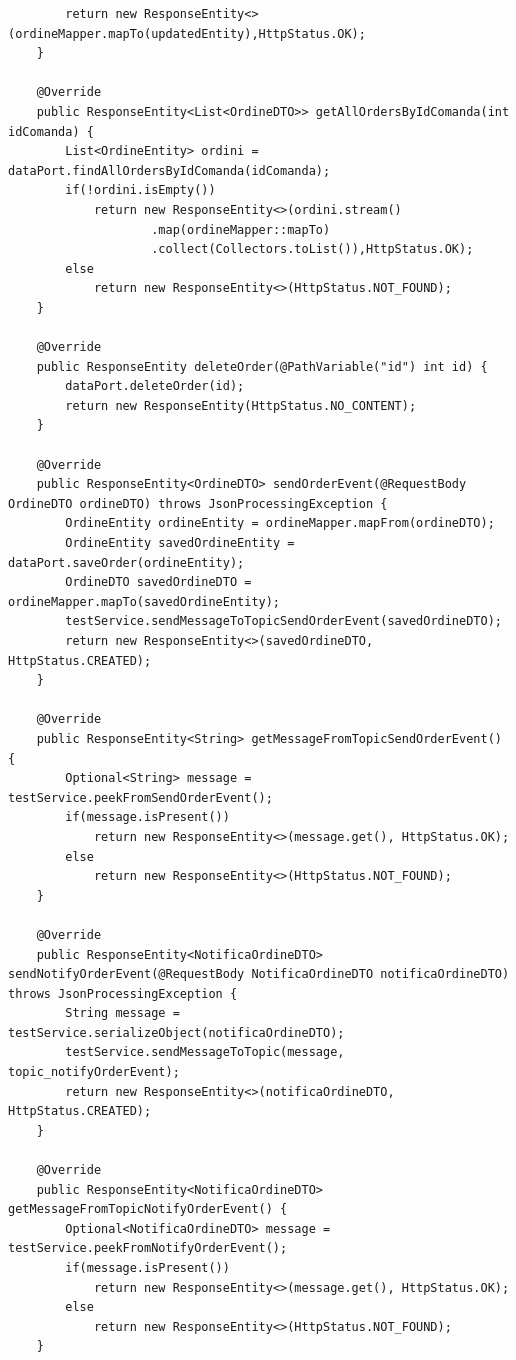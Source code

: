 \begin{lstlisting}
        return new ResponseEntity<>(ordineMapper.mapTo(updatedEntity),HttpStatus.OK);
    }

    @Override
    public ResponseEntity<List<OrdineDTO>> getAllOrdersByIdComanda(int idComanda) {
        List<OrdineEntity> ordini = dataPort.findAllOrdersByIdComanda(idComanda);
        if(!ordini.isEmpty())
            return new ResponseEntity<>(ordini.stream()
                    .map(ordineMapper::mapTo)
                    .collect(Collectors.toList()),HttpStatus.OK);
        else
            return new ResponseEntity<>(HttpStatus.NOT_FOUND);
    }

    @Override
    public ResponseEntity deleteOrder(@PathVariable("id") int id) {
        dataPort.deleteOrder(id);
        return new ResponseEntity(HttpStatus.NO_CONTENT);
    }

    @Override
    public ResponseEntity<OrdineDTO> sendOrderEvent(@RequestBody OrdineDTO ordineDTO) throws JsonProcessingException {
        OrdineEntity ordineEntity = ordineMapper.mapFrom(ordineDTO);
        OrdineEntity savedOrdineEntity = dataPort.saveOrder(ordineEntity);
        OrdineDTO savedOrdineDTO = ordineMapper.mapTo(savedOrdineEntity);
        testService.sendMessageToTopicSendOrderEvent(savedOrdineDTO);
        return new ResponseEntity<>(savedOrdineDTO, HttpStatus.CREATED);
    }

    @Override
    public ResponseEntity<String> getMessageFromTopicSendOrderEvent() {
        Optional<String> message = testService.peekFromSendOrderEvent();
        if(message.isPresent())
            return new ResponseEntity<>(message.get(), HttpStatus.OK);
        else
            return new ResponseEntity<>(HttpStatus.NOT_FOUND);
    }

    @Override
    public ResponseEntity<NotificaOrdineDTO> sendNotifyOrderEvent(@RequestBody NotificaOrdineDTO notificaOrdineDTO) throws JsonProcessingException {
        String message = testService.serializeObject(notificaOrdineDTO);
        testService.sendMessageToTopic(message, topic_notifyOrderEvent);
        return new ResponseEntity<>(notificaOrdineDTO, HttpStatus.CREATED);
    }

    @Override
    public ResponseEntity<NotificaOrdineDTO> getMessageFromTopicNotifyOrderEvent() {
        Optional<NotificaOrdineDTO> message = testService.peekFromNotifyOrderEvent();
        if(message.isPresent())
            return new ResponseEntity<>(message.get(), HttpStatus.OK);
        else
            return new ResponseEntity<>(HttpStatus.NOT_FOUND);
    }


\end{lstlisting}
